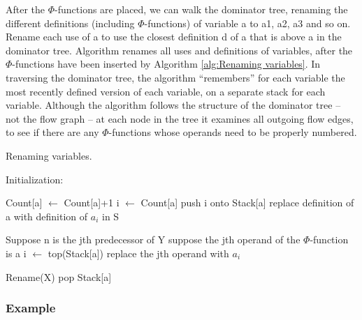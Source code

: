 After the $\Phi$-functions are placed, we can walk the dominator tree, renaming the different definitions (including $\Phi$-functions) of variable a to a1, a2, a3 and so on. Rename each use of a to use the closest definition d of a that is above a in the dominator tree. Algorithm  renames all uses and definitions of variables, after the $\Phi$-functions have been inserted by Algorithm \ref{alg:Renaming variables}. In traversing the dominator tree, the algorithm “remembers” for each variable the most recently defined version of each variable, on a separate stack for each variable. Although the algorithm follows the structure of the dominator tree – not the flow graph – at each node in the tree it examines all outgoing flow edges, to see if there are any $\Phi$-functions whose operands need to be properly numbered.



\begin{algorithm}
	\caption{Renaming variables.}\label{alg:Renaming variables}
	\begin{algorithmic}
		\State Initialization:

		\EndFor

		\EndFor
		\EndIf

		\State Count[a] $\gets$ Count[a]+1
		\State i $\gets$ Count[a]
		\State push i onto Stack[a]
		\State replace definition of a with definition of $a_i$ in S
		\EndFor
		\EndFor

		\State Suppose n is the jth predecessor of Y
		\State suppose the jth operand of the $\Phi$-function is a
		\State i $\gets$ top(Stack[a])
		\State replace the jth operand with $a_i$

		\EndFor
		\EndFor
		\State Rename(X)
		\EndFor
		\State pop Stack[a]
		\EndFor
	\end{algorithmic}
\end{algorithm}

\subsubsection{Example}




